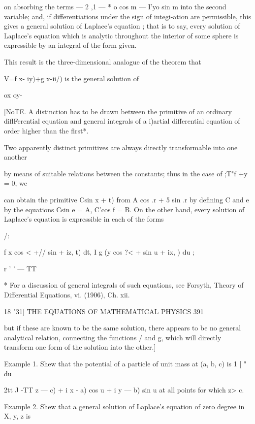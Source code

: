 on absorbing the terms — 2 ,1 — * o cos m — I'yo sin m into the second
variable; and, if differentiations under the sign of integi-ation are
permissible, this gives a general solution of Laplace's equation ;
that is to say, every solution of Laplace's equation which is analytic
throughout the interior of some sphere is expressible by an integral
of the form given.

This result is the three-dimensional analogue of the theorem that

V=f x- iy)+g x-ii/) is the general solution of

ox oy-

[NoTE. A distinction has to be drawn between the primitive of an
ordinary diflFerential equation and general integrals of a i)artial
differential equation of order higher than the first*.

Two apparently distinct primitives are always directly transformable
into one another

by means of suitable relations between the constants; thus in the case
of ;T"f +y = 0, we

can obtain the primitive Csin x + t) from A cos .r + 5 sin .r by
defining C and e by the equations Csin e = A, C'cos f = B. On the
other hand, every solution of Laplace's equation is expressible in
each of the forms



/:



f x cos < +// sin + iz, t) dt, I g (y cos ?< + sin u + ix, ) du ;

r ' ' — TT



* For a discussion of general integrals of such equations, see
Forsyth, Theory of Differential Equations, vi. (1906), Ch. xii.



18 "31] THE EQUATIONS OF MATHEMATICAL PHYSICS 391

but if these are known to be the same solution, there appears to be no
general analytical relation, connecting the functions / and g, which
will directly transform one form of the solution into the other.]

Example 1. Shew that the potential of a particle of unit mass at (a,
b, c) is 1 [ " du



2tt J -TT z — c) + i x - a) cos u + i y — b) sin u at all points for
which z> c.

Example 2. Shew that a general solution of Laplace's equation of zero
degree in X, y, z is

